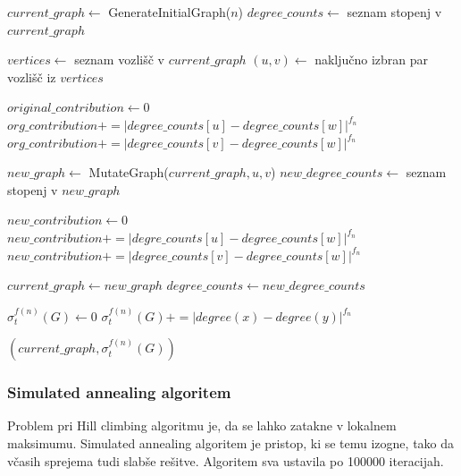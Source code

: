 \documentclass{article}
\begin{document}
    \begin{algorithmic}[1]
    
        \State $current\_graph \gets$ GenerateInitialGraph($n$)
        \State $degree\_counts \gets$ seznam stopenj v $current\_graph$
    
            \State $vertices \gets$ seznam vozlišč v $current\_graph$
            \State $(u, v) \gets$ naključno izbran par vozlišč iz $vertices$
            
            \State $original\_contribution \gets 0$
                    \State $org\_contribution += |degree\_counts[u] - degree\_counts[w]|^{f_n}$
                \EndIf
                    \State $org\_contribution += |degree\_counts[v] - degree\_counts[w]|^{f_n}$
                \EndIf
            \EndFor
    
            \State $new\_graph \gets$ MutateGraph($current\_graph, u, v$)
            \State $new\_degree\_counts \gets$ seznam stopenj v $new\_graph$
    
            \State $new\_contribution \gets 0$
                    \State $new\_contribution += |degre\_counts[u] - degree\_counts[w]|^{f_n}$
                \EndIf
                    \State $new\_contribution += |degree\_counts[v] - degree\_counts[w]|^{f_n}$
                \EndIf
            \EndFor
    
                \State $current\_graph \gets new\_graph$
                \State $degree\_counts \gets new\_degree\_counts$
            \EndIf
        \EndFor
    
        \State $\sigma_t^{f(n)}(G) \gets 0$
            \State $\sigma_t^{f(n)}(G) += |degree(x) - degree(y)|^{f_n}$
        \EndFor
    
        \State \Return $(current\_graph, \sigma_t^{f(n)}(G))$
    \EndFunction 
    
    \end{algorithmic}
    

\subsubsection*{Simulated annealing algoritem}
Problem pri Hill climbing algoritmu je, da se lahko zatakne v lokalnem 
maksimumu. Simulated annealing algoritem je pristop, ki se temu izogne,
tako da včasih sprejema tudi slabše rešitve. Algoritem sva ustavila po
100000 iteracijah.
\end{document}
